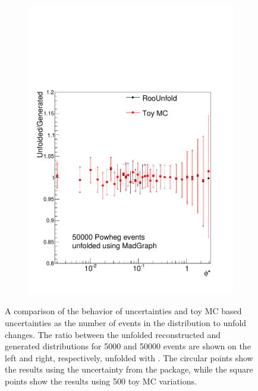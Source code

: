 \begin{figure}[!htbp]
\begin{subfigure}[b]{\SideBySidePlotWidth}
        \includegraphics[width=\textwidth]{figures/BinM_MP_50000.pdf}
        \caption{}
        \label{fig:unfolding_50000}
    \end{subfigure}
    \caption[
        A comparison of the behavior of \RooUnfold uncertainties and toy MC based
        uncertainties as the number of events in the distribution to unfold
        changes.
    ]{
        A comparison of the behavior of \RooUnfold uncertainties and toy MC
        based uncertainties as the number of events in the distribution to
        unfold changes. The ratio between the unfolded reconstructed and
        generated \phistar distributions for \num{5000} and \num{50000} \POWHEG
        events are shown on the left and right, respectively, unfolded with
        \MADGRAPH. The circular points show the results using the uncertainty
        from the \RooUnfold package, while the square points show the results
        using \num{500} toy MC variations.
    }
    \label{fig:toy_powheg_unfolding_results}
\end{figure}

